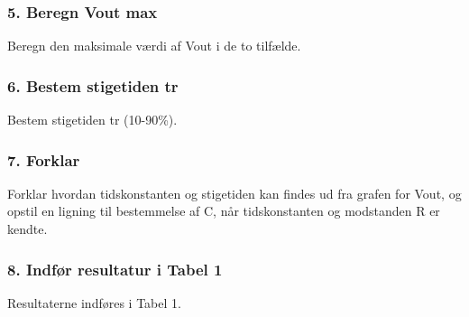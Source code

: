 \subsubsection*{5. Beregn Vout max}
Beregn den maksimale værdi af Vout i de to tilfælde.

\subsubsection*{6. Bestem stigetiden tr}
Bestem stigetiden tr (10-90\%).

\subsubsection*{7. Forklar}
Forklar hvordan tidskonstanten og stigetiden kan findes ud fra grafen for 	Vout, og opstil en ligning til bestemmelse af C, når tidskonstanten %
 og modstanden R er kendte.

\subsubsection*{8. Indfør resultatur i Tabel 1}
Resultaterne indføres i Tabel 1.

